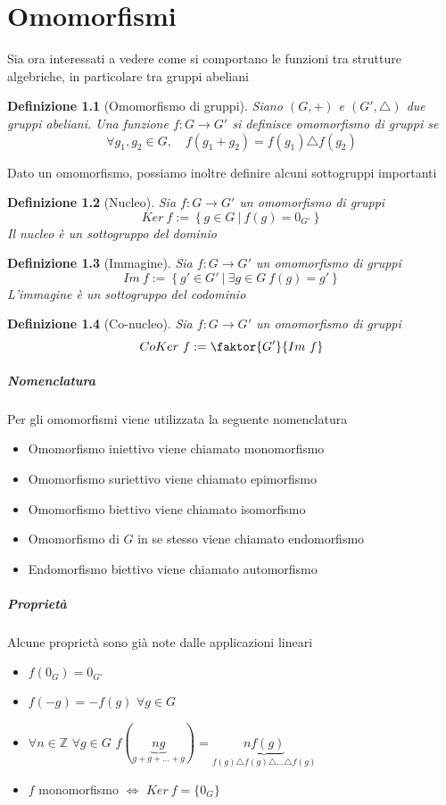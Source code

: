 \documentclass[a4paper]{report}
\newtheorem{definition}{Definizione}
\newcommand{\Z}{\ensuremath{\mathbb{Z}}}
\newcommand{\setst}[2]{\ensuremath{\left\{{#1}\ |\ {#2}\right\}}}
\begin{document}
\chapter{Omomorfismi}
Sia ora interessati a vedere come si comportano le funzioni tra strutture algebriche, in particolare tra gruppi abeliani
\begin{definition}[Omomorfismo di gruppi]
    Siano $(G,+)$ e $(G',\triangle)$ due gruppi abeliani. Una funzione $f:G\rightarrow G'$ si definisce omomorfismo di gruppi se
    \[
        \forall g_1,g_2\in G,\quad f(g_1+g_2)=f(g_1)\triangle f(g_2)
    \]
\end{definition}
Dato un omomorfismo, possiamo inoltre definire alcuni sottogruppi importanti
\begin{definition}[Nucleo]
    Sia $f:G\rightarrow G'$ un omomorfismo di gruppi
    \[
        Ker\ f:=\setst{g\in G}{f(g)=0_{G'}}
    \]
    Il nucleo è un sottogruppo del dominio
\end{definition}
\begin{definition}[Immagine]
    Sia $f:G\rightarrow G'$ un omomorfismo di gruppi
    \[
        Im\ f:=\setst{g'\in G'}{\exists g\in G\ f(g)=g'}
    \]
    L'immagine è un sottogruppo del codominio
\end{definition}
\begin{definition}[Co-nucleo]
    Sia $f:G\rightarrow G'$ un omomorfismo di gruppi
    \[
        CoKer\ f:=\faktor{G'}{Im\ f}
    \]
\end{definition}
\paragraph{Nomenclatura} Per gli omomorfismi viene utilizzata la seguente nomenclatura
\begin{itemize}
    \item Omomorfismo iniettivo viene chiamato monomorfismo
    \item Omomorfismo suriettivo viene chiamato epimorfismo
    \item Omomorfismo biettivo viene chiamato isomorfismo
    \item Omomorfismo di $G$ in se stesso viene chiamato endomorfismo
    \item Endomorfismo biettivo viene chiamato automorfismo
\end{itemize}
\paragraph{Proprietà}
Alcune proprietà sono già note dalle applicazioni lineari
\begin{itemize}
    \item $f(0_G)=0_{G'}$
    \item $f(-g)=-f(g)$ $\forall g\in G$
    \item $\forall n\in\Z$ $\forall g\in G$ $f(\underbrace{ng}_{g+g+\dots+g})=\underbrace{nf(g)}_{f(g)\triangle f(g)\triangle\dots\triangle f(g)}$
    \item $f$ monomorfismo $\Longleftrightarrow$ $Ker\ f=\{0_G\}$
\end{itemize}
\end{document}
